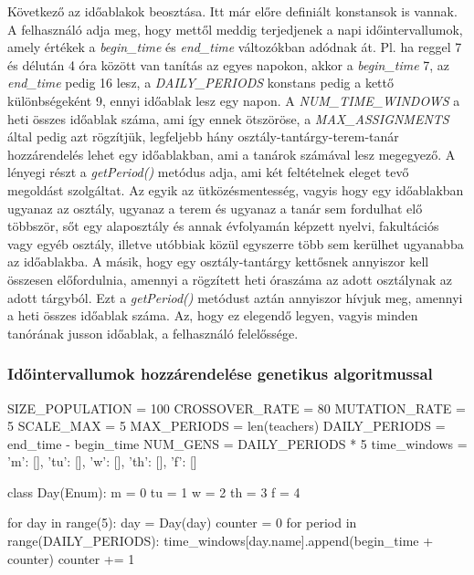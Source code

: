 \documentclass[a4paper,12pt]{article}
\begin{document}
Következő az időablakok beosztása. Itt már előre definiált konstansok is vannak. A felhasználó adja meg, hogy mettől meddig terjedjenek a napi időintervallumok, amely értékek a \textsl{begin_time} és \textsl{end_time} változókban adódnak át. Pl. ha reggel 7 és délután 4 óra között van tanítás az egyes napokon, akkor a \textsl{begin_time} 7, az \textsl{end_time} pedig 16 lesz, a \textsl{DAILY_PERIODS} konstans pedig a kettő különbségeként 9, ennyi időablak lesz egy napon. A \textsl{NUM_TIME_WINDOWS} a heti összes időablak száma, ami így ennek ötszöröse, a \textsl{MAX_ASSIGNMENTS} által pedig azt rögzítjük, legfeljebb hány osztály-tantárgy-terem-tanár hozzárendelés lehet egy időablakban, ami a tanárok számával lesz megegyező. A lényegi részt a \textsl{getPeriod()} metódus adja, ami két feltételnek eleget tevő megoldást szolgáltat. Az egyik az ütközésmentesség, vagyis hogy egy időablakban ugyanaz az osztály, ugyanaz a terem és ugyanaz a tanár sem fordulhat elő többször, sőt egy alaposztály és annak évfolyamán képzett nyelvi, fakultációs vagy egyéb osztály, illetve utóbbiak közül egyszerre több sem kerülhet ugyanabba az időablakba. A másik, hogy egy osztály-tantárgy kettősnek annyiszor kell összesen előfordulnia, amennyi a rögzített heti óraszáma az adott osztálynak az adott tárgyból. Ezt a \textsl{getPeriod()} metódust aztán annyiszor hívjuk meg, amennyi a heti összes időablak száma. Az, hogy ez elegendő legyen, vagyis minden tanórának jusson időablak, a felhasználó felelőssége.

\subsubsection{Időintervallumok hozzárendelése genetikus algoritmussal}

\begin{python}
SIZE_POPULATION = 100
CROSSOVER_RATE = 80
MUTATION_RATE = 5
SCALE_MAX = 5
MAX_PERIODS = len(teachers)
DAILY_PERIODS = end_time - begin_time
NUM_GENS = DAILY_PERIODS * 5
time_windows = {'m': [], 'tu': [], 'w': [], 'th': [], 'f': []}


class Day(Enum):
    m = 0
    tu = 1
    w = 2
    th = 3
    f = 4


for day in range(5):
    day = Day(day)
    counter = 0
    for period in range(DAILY_PERIODS):
        time_windows[day.name].append(begin_time + counter)
        counter += 1
\end{python}
\end{document}
